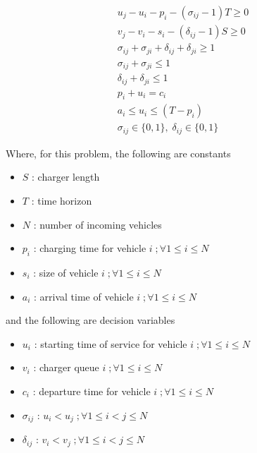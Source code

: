 \documentclass[letterpaper, 10pt, conference]{IEEEtran}
\begin{document}
\begin{subequations}
\label{eq:bapconstrs}
\begin{align}
    u_j - u_i - p_i - (\sigma_{ij} - 1)T \geq 0                     \label{subeq:baptime}         \\
    v_j - v_i - s_i - (\delta_{ij} - 1)S \geq 0                     \label{subeq:bapspace}        \\
    \sigma_{ij} + \sigma_{ji} + \delta_{ij} + \delta_{ji} \geq 1    \label{subeq:bapvalid_pos}    \\
    \sigma_{ij} + \sigma_{ji} \leq 1                                \label{subeq:bapsigma}        \\
    \delta_{ij} + \delta_{ji} \leq 1                                \label{subeq:bapdelta}        \\
    p_i + u_i = c_i                                                 \label{subeq:bapdetach}       \\
    a_i \leq u_i \leq (T - p_i)                                     \label{subeq:bapvalid_starts} \\
    \sigma_{ij} \in \{0,1\},\;\delta_{ij} \in \{0,1\}               \label{subeq:bapsdspace}
\end{align}
\end{subequations}

\noindent
Where, for this problem, the following are constants

\begin{itemize}
	\item \(S\)   : charger length
	\item \(T\)   : time horizon
	\item \(N\)   : number of incoming vehicles
	\item \(p_i\) : charging time for vehicle \(i\;; \forall 1 \leq i \leq N\)
	\item \(s_i\) : size of vehicle \(i\;; \forall 1 \leq i \leq N\)
	\item \(a_i\) : arrival time of vehicle \(i\;; \forall 1 \leq i \leq N\)
\end{itemize}

\noindent
and the following are decision variables

\begin{itemize}
    \item \(u_i\)         : starting time of service for vehicle \(i\;; \forall 1 \leq i \leq N\)
    \item \(v_i\)         : charger queue \(i\;; \forall 1 \leq i \leq N\)
    \item \(c_i\)         : departure time for vehicle \(i\;; \forall 1 \leq i \leq N\)
    \item \(\sigma_{ij}\) : \(u_i < u_j\;; \forall 1 \leq i < j \leq N\)
    \item \(\delta_{ij}\) : \(v_i < v_j\;; \forall 1 \leq i < j \leq N\)
\end{itemize}
\end{document}
